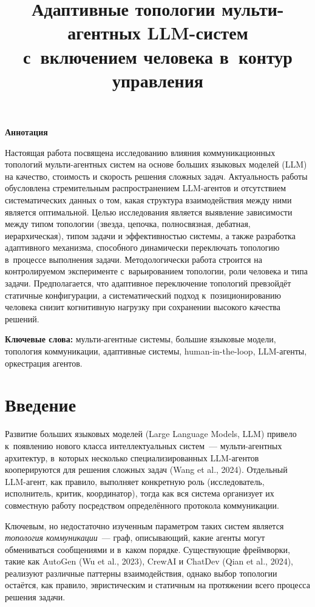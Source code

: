 \documentclass[12pt, a4paper]{article}
\title{\textbf{Адаптивные топологии мульти-агентных LLM-систем\\с~включением человека в~контур управления}}
\author{}
\date{}
\begin{document}
\maketitle
\thispagestyle{empty}

\begin{center}
\textbf{Аннотация}
\end{center}

Настоящая работа посвящена исследованию влияния коммуникационных топологий мульти-агентных систем на основе больших языковых моделей (LLM) на качество, стоимость и скорость решения сложных задач. Актуальность работы обусловлена стремительным распространением LLM-агентов и отсутствием систематических данных о том, какая структура взаимодействия между ними является оптимальной. Целью исследования является выявление зависимости между типом топологии (звезда, цепочка, полносвязная, дебатная, иерархическая), типом задачи и эффективностью системы, а также разработка адаптивного механизма, способного динамически переключать топологию в~процессе выполнения задачи. Методологически работа строится на контролируемом эксперименте с~варьированием топологии, роли человека и типа задачи. Предполагается, что адаптивное переключение топологий превзойдёт статичные конфигурации, а систематический подход к~позиционированию человека снизит когнитивную нагрузку при сохранении высокого качества решений.

\medskip

\noindent\textbf{Ключевые слова:} мульти-агентные системы, большие языковые модели, топология коммуникации, адаптивные системы, human-in-the-loop, LLM-агенты, оркестрация агентов.

\newpage

\section{Введение}

Развитие больших языковых моделей (Large Language Models, LLM) привело к~появлению нового класса интеллектуальных систем~--- мульти-агентных архитектур, в~которых несколько специализированных LLM-агентов кооперируются для решения сложных задач (Wang et al., 2024). Отдельный LLM-агент, как правило, выполняет конкретную роль (исследователь, исполнитель, критик, координатор), тогда как вся система организует их совместную работу посредством определённого протокола коммуникации.

Ключевым, но недостаточно изученным параметром таких систем является \textit{топология коммуникации}~--- граф, описывающий, какие агенты могут обмениваться сообщениями и в~каком порядке. Существующие фреймворки, такие как AutoGen (Wu et al., 2023), CrewAI и ChatDev (Qian et al., 2024), реализуют различные паттерны взаимодействия, однако выбор топологии остаётся, как правило, эвристическим и статичным на протяжении всего процесса решения задачи.
\end{document}
